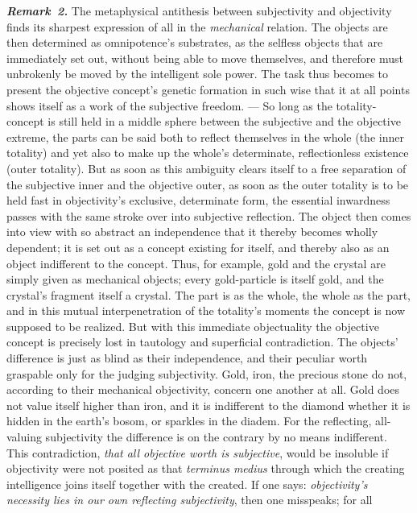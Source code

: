 \documentclass[12pt]{book}
\newcommand{\anm}[1]{\emph{\textbf{Remark~#1.}}}
\begin{document}
\anm{2} The metaphysical antithesis between subjectivity and objectivity
finds its sharpest expression of all in the \emph{mechanical} relation. The
objects are then determined as omnipotence's substrates, as the selfless
objects that are immediately set out, without being able to move themselves,
and therefore must unbrokenly be moved by the intelligent sole power. The
task thus becomes to present the objective concept's genetic formation in
such wise that it at all points shows itself as a work of the subjective
freedom. --- So long as the totality-concept is still held in a middle
sphere between the subjective and the objective extreme, the parts can be
said both to reflect themselves in the whole (the inner totality) and yet
also to make up the whole's determinate, reflectionless existence (outer
totality). But as soon as this ambiguity clears itself to a free separation
of the subjective inner and the objective outer, as soon as the outer
totality is to be held fast in objectivity's exclusive, determinate form,
the essential inwardness passes with the same stroke over into subjective
reflection. The object then comes into view with so abstract an independence
that it thereby becomes wholly dependent; it is set out as a concept
existing for itself, and thereby also as an object indifferent to the
concept. Thus, for example, gold and the crystal are simply given as
mechanical objects; every gold-particle is itself gold, and the crystal's
fragment itself a crystal. The part is as the whole, the whole as the part,
and in this mutual interpenetration of the totality's moments the concept is
now supposed to be realized. But with this immediate objectuality the
objective concept is precisely lost in tautology and superficial
contradiction. The objects' difference is just as blind as their
independence, and their peculiar worth graspable only for the judging
subjectivity. Gold, iron, the precious stone do not, according to their
mechanical objectivity, concern one another at all. Gold does not value
itself higher than iron, and it is indifferent to the diamond whether it is
hidden in the earth's bosom, or sparkles in the diadem. For the reflecting,
all-valuing subjectivity the difference is on the contrary by no means
indifferent. This contradiction, \emph{that all objective worth is
subjective}, would be insoluble if objectivity were not posited as that
\textit{terminus medius} through which the creating intelligence joins
itself together with the created. If one says: \emph{objectivity's necessity
lies in our own reflecting subjectivity}, then one misspeaks; for all
\end{document}
